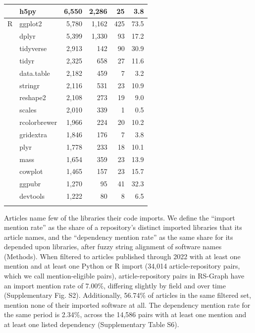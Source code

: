 \documentclass[pdflatex,sn-nature]{sn-jnl}%
\begin{document}
\begin{table}[ht]
\begin{tabular}{@{}llrrrr@{}}
 & h5py & 6,550 & 2,286 & 25 & 3.8 \\
\midrule
R & ggplot2 & 5,780 & 1,162 & 425 & 73.5 \\
 & dplyr & 5,399 & 1,330 & 93 & 17.2 \\
 & tidyverse & 2,913 & 142 & 90 & 30.9 \\
 & tidyr & 2,325 & 658 & 27 & 11.6 \\
 & data.table & 2,182 & 459 & 7 & 3.2 \\
 & stringr & 2,116 & 531 & 23 & 10.9 \\
 & reshape2 & 2,108 & 273 & 19 & 9.0 \\
 & scales & 2,010 & 339 & 1 & 0.5 \\
 & rcolorbrewer & 1,966 & 224 & 20 & 10.2 \\
 & gridextra & 1,846 & 176 & 7 & 3.8 \\
 & plyr & 1,778 & 233 & 18 & 10.1 \\
 & mass & 1,654 & 359 & 23 & 13.9 \\
 & cowplot & 1,465 & 157 & 23 & 15.7 \\
 & ggpubr & 1,270 & 95 & 41 & 32.3 \\
 & devtools & 1,222 & 80 & 8 & 6.5 \\
\botrule
\end{tabular}
\end{table}

Articles name few of the libraries their code imports. We define the ``import mention rate'' as the share of a repository's distinct imported libraries that its article names, and the ``dependency mention rate'' as the same share for its depended upon libraries, after fuzzy string alignment of software names (Methods). When filtered to articles published through 2022 with at least one mention and at least one Python or R import (34,014 article-repository pairs, which we call mention-eligible pairs), article-repository pairs in RS-Graph have an import mention rate of 7.00\%, differing slightly by field and over time (Supplementary Fig. S2). Additionally, 56.74\% of articles in the same filtered set, mention none of their imported software at all. The dependency mention rate for the same period is 2.34\%, across the 14,586 pairs with at least one mention and at least one listed dependency (Supplementary Table S6).
\end{document}
